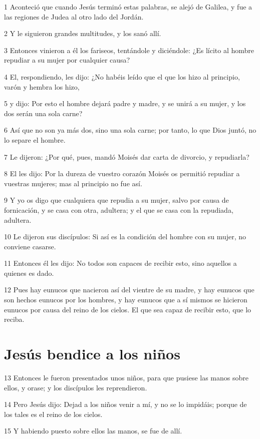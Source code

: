 \par 1 Aconteció que cuando Jesús terminó estas palabras, se alejó de Galilea, y fue a las regiones de Judea al otro lado del Jordán.
\par 2 Y le siguieron grandes multitudes, y los sanó allí.
\par 3 Entonces vinieron a él los fariseos, tentándole y diciéndole: ¿Es lícito al hombre repudiar a su mujer por cualquier causa?
\par 4 El, respondiendo, les dijo: ¿No habéis leído que el que los hizo al principio, varón y hembra los hizo,
\par 5 y dijo: Por esto el hombre dejará padre y madre, y se unirá a su mujer, y los dos serán una sola carne?
\par 6 Así que no son ya más dos, sino una sola carne; por tanto, lo que Dios juntó, no lo separe el hombre.
\par 7 Le dijeron: ¿Por qué, pues, mandó Moisés dar carta de divorcio, y repudiarla?
\par 8 El les dijo: Por la dureza de vuestro corazón Moisés os permitió repudiar a vuestras mujeres; mas al principio no fue así.
\par 9 Y yo os digo que cualquiera que repudia a su mujer, salvo por causa de fornicación, y se casa con otra, adultera; y el que se casa con la repudiada, adultera.
\par 10 Le dijeron sus discípulos: Si así es la condición del hombre con su mujer, no conviene casarse.
\par 11 Entonces él les dijo: No todos son capaces de recibir esto, sino aquellos a quienes es dado.
\par 12 Pues hay eunucos que nacieron así del vientre de su madre, y hay eunucos que son hechos eunucos por los hombres, y hay eunucos que a sí mismos se hicieron eunucos por causa del reino de los cielos. El que sea capaz de recibir esto, que lo reciba.

\section*{Jesús bendice a los niños}

\par 13 Entonces le fueron presentados unos niños, para que pusiese las manos sobre ellos, y orase; y los discípulos les reprendieron.
\par 14 Pero Jesús dijo: Dejad a los niños venir a mí, y no se lo impidáis; porque de los tales es el reino de los cielos.
\par 15 Y habiendo puesto sobre ellos las manos, se fue de allí.

